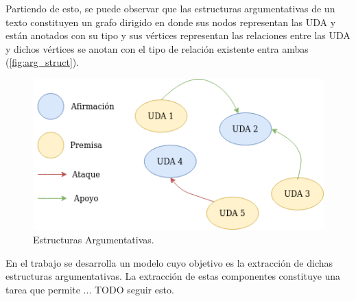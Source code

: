 Partiendo de esto, se puede observar que las estructuras argumentativas de un texto constituyen un grafo dirigido 
en donde sus nodos representan las UDA y están anotados con su tipo y sus vértices representan las 
relaciones entre las UDA y dichos vértices se anotan con el tipo de relación existente entra ambas (\ref{fig:arg_struct}).

\begin{figure}[h!]
	\begin{center}
		\begin{center}
			\includegraphics[scale=.7]{Graphics/Estructuras_argumentativas.png}
        \end{center}
	    \caption{Estructuras Argumentativas.}
	\end{center}
\end{figure}\label{fig:arg_struct}


En el trabajo se desarrolla un modelo cuyo objetivo es la extracción de dichas estructuras argumentativas. 
La extracción de estas componentes constituye una tarea que permite ... TODO seguir esto.
